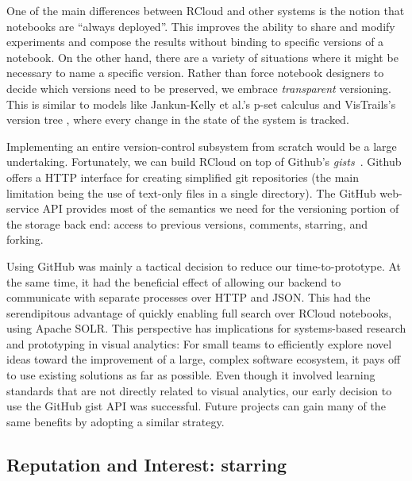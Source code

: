 One of the main differences between RCloud and other systems is the
notion that notebooks are ``always deployed''. This improves the
ability to share and modify experiments and compose the results
without binding to specific versions of a notebook.
On the other hand, there are a variety of situations where it might
be necessary to name a specific version. Rather than force notebook
designers to decide which versions need to be preserved,
we embrace \emph{transparent} versioning.
This is similar to models like Jankun-Kelly et al.'s p-set calculus \cite{Jankun-Kelly:2007:MFV}
and VisTrails's version tree \cite{Callahan:2006:VVM}, where every change in the state of the system is tracked.

Implementing an entire version-control subsystem from scratch would
be a large undertaking. Fortunately, we can build RCloud on top of Github's
\emph{gists}~\cite{Github:2014:GG}. Github offers a HTTP interface
for creating simplified git repositories (the main limitation being the
use of text-only files in a single directory). The GitHub web-service
API provides most of the semantics we need for the versioning
portion of the storage back end: access to previous versions,
comments, starring, and forking.

Using GitHub was mainly a tactical decision to reduce our
time-to-prototype. At the same time, it had the beneficial effect of
allowing our backend to communicate with separate processes over HTTP
and JSON. This had the serendipitous advantage of quickly enabling
full search over RCloud notebooks, using Apache SOLR.
%
This perspective has implications for
systems-based research and prototyping in visual analytics:
For small teams to efficiently explore novel ideas toward the
improvement of a large, complex software ecosystem, it pays off
to use existing solutions as far as possible.
%
Even though it involved learning standards that are not directly
related to visual analytics, our early decision to use the GitHub
gist API was successful. Future projects can gain many
of the same benefits by adopting a similar strategy.


\subsection{Reputation and Interest: starring\label{sec:starring}}

